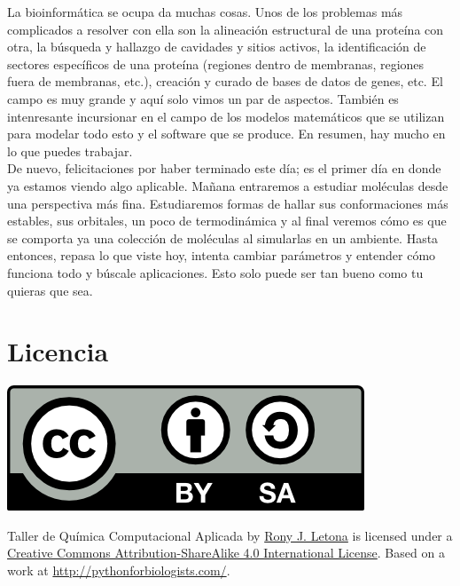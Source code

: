 \documentclass[10pt,letterpaper]{article}
\begin{document}
La bioinform\'atica se ocupa da muchas cosas. Unos de los problemas m\'as complicados a resolver con ella son la alineaci\'on estructural de una prote\'ina con otra, la b\'usqueda y hallazgo de cavidades y sitios activos, la identificaci\'on de sectores espec\'ificos de una prote\'ina (regiones dentro de membranas, regiones fuera de membranas, etc.), creaci\'on y curado de bases de datos de genes, etc. El campo es muy grande y aqu\'i solo vimos un par de aspectos. Tambi\'en es intenresante incursionar en el campo de los modelos matem\'aticos que se utilizan para modelar todo esto y el software que se produce. En resumen, hay mucho en lo que puedes trabajar.\\

De nuevo, felicitaciones por haber terminado este d\'ia; es el primer d\'ia en donde ya estamos viendo algo aplicable. Ma\~nana entraremos a estudiar mol\'eculas desde una perspectiva m\'as fina. Estudiaremos formas de hallar sus conformaciones m\'as estables, sus orbitales, un poco de termodin\'amica y al final veremos c\'omo es que se comporta ya una colecci\'on de mol\'eculas al simularlas en un ambiente. Hasta entonces, repasa lo que viste hoy, intenta cambiar par\'ametros y entender c\'omo funciona todo y b\'uscale aplicaciones. Esto solo puede ser tan bueno como tu quieras que sea.

\section*{Licencia}

\noindent \includegraphics{img/cc_big.png}

\noindent Taller de Qu\'imica Computacional Aplicada by \href{http://github.com/zronyj/TQCA}{Rony J. Letona} is licensed under a \href{http://creativecommons.org/licenses/by-sa/4.0/}{Creative Commons Attribution-ShareAlike 4.0 International License}.
Based on a work at \url{http://pythonforbiologists.com/}.
\end{document}
